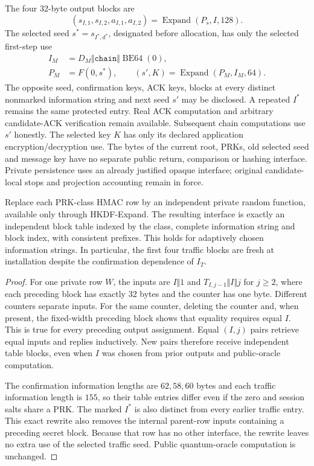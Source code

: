 The four 32-byte output blocks are
\[
 (s_{I,1},s_{I,2},a_{I,1},a_{I,2})
 =\operatorname{Expand}(P_s,I,128).
\]
The selected seed $s^*=s_{I^*,d^*}$, designated before allocation,
has only the selected first-step use
\begin{equation}
 \begin{split}
 I_M&=D_M\Vert\texttt{chain}\Vert\operatorname{BE64}(0),\\
 P_M&=F(0,s^*),\qquad
 (s',K)=\operatorname{Expand}(P_M,I_M,64).
 \end{split}
 \label{eq:joint-chain-step}
\end{equation}
The opposite seed, confirmation keys, ACK keys, blocks at every distinct
nonmarked information string and next seed $s'$ may be disclosed.
A repeated $I^*$ remains the same protected entry.
Real ACK computation and arbitrary candidate-ACK verification
remain available. Subsequent chain computations use $s'$ honestly.
The selected key $K$ has only its declared application encryption/decryption
use. The bytes of the current root, PRKs, old selected seed and message key
have no separate public return, comparison or hashing interface. Private persistence
uses an already justified opaque interface; original candidate-local stops
and projection accounting remain in force.

\begin{lemma}
\label{lem:joint-expand-blocks}
Replace each PRK-class HMAC row by an independent private random function,
available only through HKDF-Expand. The resulting interface is exactly an
independent block table indexed by the class, complete information string
and block index, with consistent prefixes. This holds for adaptively
chosen information strings. In particular, the first four traffic blocks
are fresh at installation despite the confirmation dependence of $I_T$.
\end{lemma}
\begin{proof}
For one private row $W$, the inputs are
$I\Vert1$ and $T_{I,j-1}\Vert I\Vert j$ for $j\ge2$, where each preceding
block has exactly 32 bytes and the counter has one byte. Different counters
separate inputs. For the same counter, deleting the counter and, when
present, the fixed-width preceding block shows that equality requires equal
$I$. This is true for every preceding output assignment. Equal $(I,j)$
pairs retrieve equal inputs and replies inductively. New pairs therefore
receive independent table blocks, even when $I$ was chosen from prior
outputs and public-oracle computation.

The confirmation information lengths are $62,58,60$ bytes and each traffic
information length is $155$, so their table entries differ even if the
zero and session salts share a PRK. The marked $I^*$ is also distinct from
every earlier traffic entry. This exact rewrite also removes
the internal parent-row inputs containing a preceding secret block.
Because that row has no other interface, the rewrite leaves no extra use of the
selected traffic seed. Public quantum-oracle computation is unchanged.
\end{proof}

